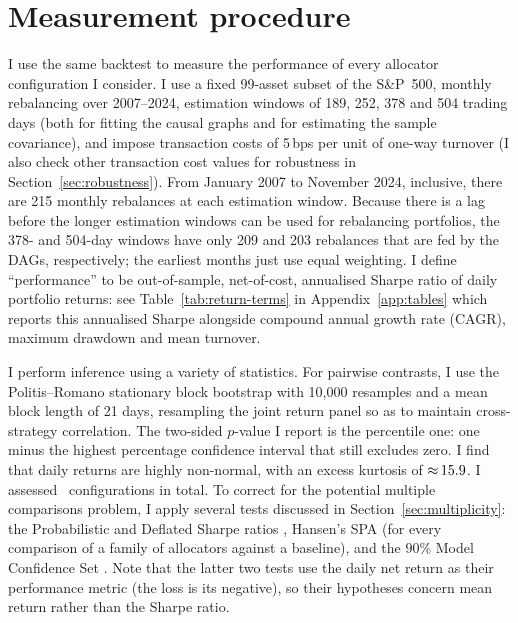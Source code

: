 \documentclass[11pt, a4paper]{report}
\begin{document}
\section{Measurement procedure}
\label{sec:measurement}

I use the same backtest to measure the performance of every allocator configuration I consider. I use a fixed 99-asset subset of the S\&P~500, monthly rebalancing over 2007--2024, estimation windows of 189, 252, 378 and 504 trading days (both for fitting the causal graphs and for estimating the sample covariance), and impose transaction costs of 5\,bps per unit of one-way turnover (I also check other transaction cost values for robustness in Section~\ref{sec:robustness}).
From January 2007 to November 2024, inclusive, there are 215 monthly rebalances at each estimation window. Because there is a lag before the longer estimation windows can be used for rebalancing portfolios, the 378- and 504-day windows have only 209 and 203 rebalances that are fed by the DAGs, respectively; the earliest months just use equal weighting.
I define ``performance'' to be out-of-sample, net-of-cost, annualised Sharpe ratio of daily portfolio returns: see Table~\ref{tab:return-terms} in Appendix~\ref{app:tables} which reports this annualised Sharpe alongside compound annual growth rate (CAGR), maximum drawdown and mean turnover.

I perform inference using a variety of statistics.
For pairwise contrasts, I use the Politis--Romano stationary block bootstrap \cite{politis1994stationary} with 10{,}000 resamples and a mean block length of 21 days, resampling the joint return panel so as to maintain cross-strategy correlation.
The two-sided $p$-value I report is the percentile one: one minus the highest percentage confidence interval that still excludes zero.
I find that daily returns are highly non-normal, with an excess kurtosis of
${\approx}\,15.9$.
I assessed \rsNtrials\ configurations in total. To correct for the potential multiple comparisons problem, I apply several tests discussed in Section~\ref{sec:multiplicity}: the Probabilistic and Deflated Sharpe
ratios \cite{bailey2012psr,bailey2014deflated}, Hansen's SPA \cite{hansen2005spa} (for every comparison of a family of allocators against a baseline), and the $90\%$ Model Confidence Set \cite{hansen2011mcs}.
Note that the latter two tests use the daily net return as their performance metric (the loss is its negative), so their hypotheses concern mean return rather than the Sharpe ratio.
\end{document}
